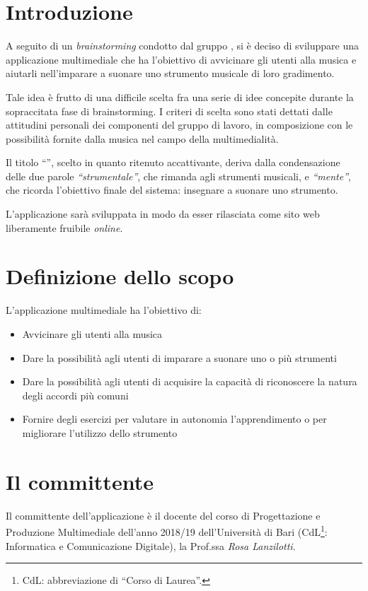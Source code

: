 \section{Introduzione}
A seguito di un \textit{brainstorming} condotto dal gruppo \theteam{}, si è deciso di sviluppare una applicazione multimediale che ha l'obiettivo di avvicinare gli utenti alla musica e aiutarli nell'imparare a suonare uno strumento musicale di loro gradimento.

Tale idea è frutto di una difficile scelta fra una serie di idee concepite durante la sopraccitata fase di brainstorming. I criteri di scelta sono stati dettati dalle attitudini personali dei componenti del gruppo di lavoro, in composizione con le possibilità fornite dalla musica nel campo della multimedialità.

Il titolo ``\ProjectTitle{}'', scelto in quanto ritenuto accattivante, deriva dalla condensazione delle due parole \emph{``strumentale''}, che rimanda agli strumenti musicali, e \emph{``mente''}, che ricorda l'obiettivo finale del sistema: insegnare a suonare uno strumento.

L'applicazione sarà sviluppata in modo da esser rilasciata come sito web liberamente fruibile \emph{online}.

\section{Definizione dello scopo}
L'applicazione multimediale \ProjectTitle{} ha l'obiettivo di:
\begin{itemize}
	\item Avvicinare gli utenti alla musica
	\item Dare la possibilità agli utenti di imparare a suonare uno o più strumenti
	\item Dare la possibilità agli utenti di acquisire la capacità di riconoscere la natura degli accordi più comuni
	\item Fornire degli esercizi per valutare in autonomia l'apprendimento o per migliorare l'utilizzo dello strumento
\end{itemize}

\section{Il committente}
Il committente dell'applicazione è il docente del corso di Progettazione e Produzione Multimediale dell'anno 2018/19 dell'Università di Bari (CdL\footnote{CdL: abbreviazione di ``Corso di Laurea''.}: Informatica e Comunicazione Digitale), la Prof.ssa \emph{Rosa Lanzilotti}.

